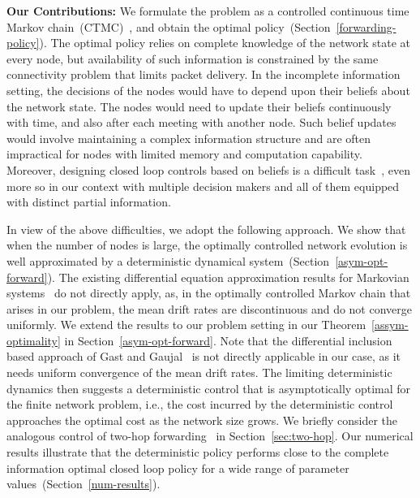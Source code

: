 \documentclass[10pt,journal,letterpaper]{IEEEtran}
\begin{document}
\noindent
{\bf Our Contributions:} We formulate the problem as a controlled
continuous time Markov
chain~(CTMC)~\cite{stochctrl.bertsekas07dpoc-vol2}, and obtain the
optimal policy~(Section~\ref{forwarding-policy}). The optimal policy
relies on complete knowledge of the network state at every node,
but availability of  such information is constrained by the same connectivity
problem that limits packet delivery. In the incomplete information
setting, the decisions of the nodes would have to depend upon their beliefs
about the network state. The nodes would need to update their
beliefs continuously with time, and also after each meeting with
another node. Such belief updates would involve maintaining a complex
information structure and are often impractical for nodes with limited memory and
computation capability. Moreover, designing closed loop controls based on beliefs is a difficult
task~\cite{stochctrl-dtn.singhetal10dtn-twohop}, even more so in our
context with multiple decision makers and all of them equipped with
distinct partial information.

In view of the above difficulties, we adopt the following approach.
We show that when the number of
nodes is large, the optimally controlled network evolution is well
approximated by a deterministic dynamical system~(Section~\ref{asym-opt-forward}).
The existing differential equation approximation results for
Markovian systems~\cite{stochproc.kurtz70limits-markov-processes,stochproc.darling02fluid-limits}
do not directly apply, as, in the optimally controlled Markov chain that arises in our problem,
the mean drift rates are discontinuous and do not converge uniformly.
We extend the results to our problem setting in our Theorem~\ref{assym-optimality} in Section~\ref{asym-opt-forward}.
Note that the differential inclusion based approach of Gast and Gaujal~\cite{stochctrl.gast-gaujal10mean-field-nonsmooth}
is not directly applicable in our case, as it needs uniform
convergence of the mean drift rates.
The limiting deterministic dynamics then suggests a deterministic control
that is asymptotically optimal for the finite network problem, i.e.,
the cost incurred by the deterministic control approaches
the optimal cost as the network size grows.
We briefly consider the analogous control of two-hop forwarding~\cite{comnet-wireless.grossglauser-tse02mobility-adhoc-networks} 
in Section~\ref{sec:two-hop}.
Our numerical results
illustrate that the deterministic policy performs close to the
complete information optimal closed loop policy for a wide range of
parameter values~(Section~\ref{num-results}).
\end{document}
